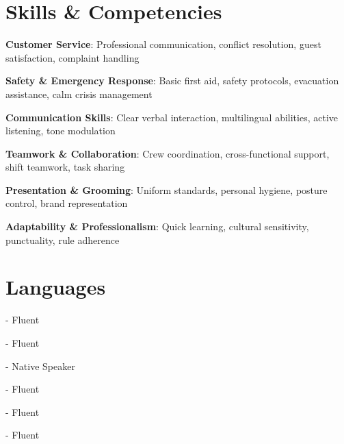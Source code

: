 \documentclass[a4paper,11pt]{article}
\begin{document}
\section{Skills \& Competencies}
\begin{itemize}[leftmargin=0.15in, label={}, itemsep=0pt]
	\small{
		\item \textbf{Customer Service}: Professional communication, conflict resolution, guest satisfaction, complaint handling
		\item \textbf{Safety \& Emergency Response}: Basic first aid, safety protocols, evacuation assistance, calm crisis management
		\item \textbf{Communication Skills}: Clear verbal interaction, multilingual abilities, active listening, tone modulation
		\item \textbf{Teamwork \& Collaboration}: Crew coordination, cross-functional support, shift teamwork, task sharing
		\item \textbf{Presentation \& Grooming}: Uniform standards, personal hygiene, posture control, brand representation
		\item \textbf{Adaptability \& Professionalism}: Quick learning, cultural sensitivity, punctuality, rule adherence
	}
\end{itemize}

\section{Languages}
\begin{itemize}[leftmargin=0.15in, label={}, itemsep=1pt]
    \small{
        \item {} - Fluent
        \item {} - Fluent
        \item {} - Native Speaker
        \item {} - Fluent
        \item {} - Fluent
        \item {} - Fluent
    }
\end{itemize}
\end{document}
